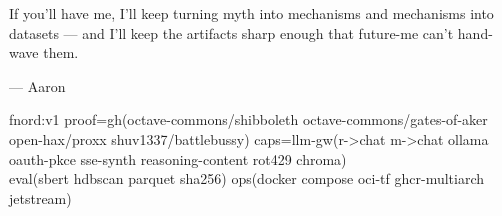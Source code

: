 \documentclass[10pt]{article}
\begin{document}
If you'll have me, I'll keep turning myth into mechanisms and mechanisms into datasets --- and I'll keep the artifacts sharp enough that future-me can't hand-wave them.

--- Aaron

\vspace{8pt}
{\scriptsize\ttfamily
fnord:v1\; proof=gh(octave-commons/shibboleth octave-commons/gates-of-aker open-hax/proxx shuv1337/battlebussy)\; caps=llm-gw(r->chat m->chat ollama oauth-pkce sse-synth reasoning-content rot429 chroma)\\
eval(sbert hdbscan parquet sha256)\; ops(docker compose oci-tf ghcr-multiarch jetstream)
}
\end{document}
